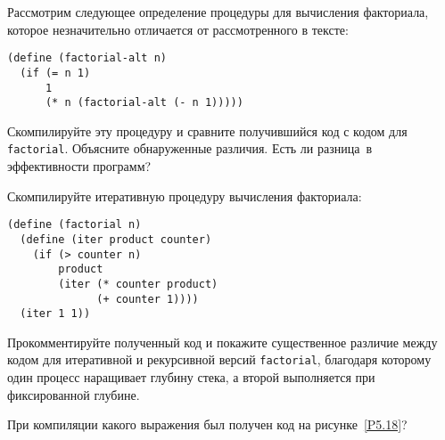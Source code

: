 \begin{exercise}{5.33}%
\label{EX5.33}%
Рассмотрим следующее определение процедуры для вычисления
факториала, которое незначительно отличается от рассмотренного в
тексте:

\begin{Verbatim}[fontsize=\small]
(define (factorial-alt n)
  (if (= n 1)
      1
      (* n (factorial-alt (- n 1)))))
\end{Verbatim}
Скомпилируйте эту процедуру и сравните получившийся код с кодом для
{\tt factorial}.  Объясните обнаруженные различия.  Есть ли
разница~в эффективности программ?
\end{exercise}
\begin{exercise}{5.34}%
\label{EX5.34}%
%
%
Скомпилируйте итеративную процедуру вычисления факториала:

\begin{Verbatim}[fontsize=\small]
(define (factorial n)
  (define (iter product counter)
    (if (> counter n)
        product
        (iter (* counter product)
              (+ counter 1))))
  (iter 1 1))
\end{Verbatim}
Прокомментируйте полученный код и покажите существенное различие между
кодом для итеративной и рекурсивной версий {\tt factorial},
благодаря которому один процесс наращивает глубину стека,
а второй выполняется при фиксированной глубине.
\end{exercise}
\begin{exercise}{5.35}%
\label{EX5.35}%
При компиляции какого выражения был получен код на
рисунке~\ref{P5.18}?
\end{exercise}
\pagebreak
